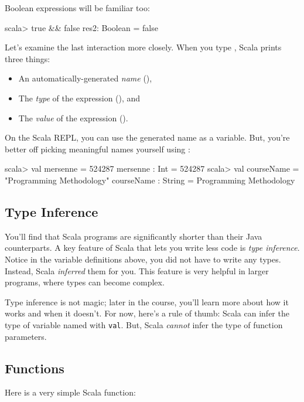 \documentclass{book}
\begin{document}
Boolean expressions will be familiar too:

\begin{console}
scala> true && false
res2: Boolean = false
\end{console}

Let's examine the last interaction more closely. When you type ,
Scala prints three things:
%
\begin{itemize}
\item An automatically-generated \emph{name} (),
\item The \emph{type} of the expression (), and
\item The \emph{value} of the expression ().
\end{itemize}

On the Scala REPL, you can use the generated name as a variable. But, you're
better off picking meaningful names yourself using :

\begin{console}
scala> val mersenne = 524287
mersenne : Int = 524287
scala> val courseName = "Programming Methodology"
courseName : String = Programming Methodology
\end{console}

\subsection{Type Inference}

You'll find that Scala programs are significantly shorter than their Java
counterparts. A key feature of Scala that lets you write less code is \emph{type
inference}. Notice in the variable definitions above, you did not have to write
any types. Instead, Scala \emph{inferred} them for you. This feature is very helpful
in larger programs, where types can become complex.

Type inference is not magic; later in the course, you'll learn more about how it
works and when it doesn't. For now, here's a rule of thumb: Scala can infer the
type of variable named with \verb|val|. But, Scala \emph{cannot} infer the type of
function parameters.

\subsection{Functions}

Here is a very simple Scala function:
\end{document}
